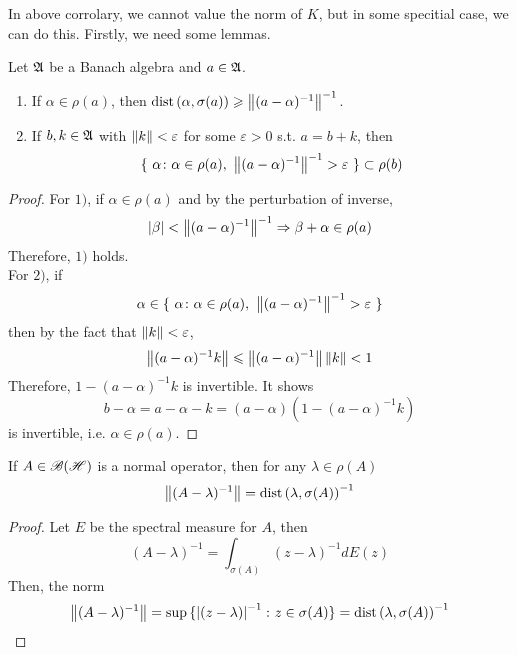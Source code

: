 In above corrolary, we cannot value the norm of $K$, but in some specitial case, we can do this. Firstly, we need some lemmas.
\begin{lem}
	Let $\mathfrak{A}$ be a Banach algebra and $a \in \mathfrak{A}$.
	\begin{enumerate}[label=\arabic*)]
		\item If $\alpha \in \rho(a)$, then $\operatorname{dist}{(\alpha,\sigma(a))} \geqslant \left\lVert(a-\alpha)^{-1}\right\lVert^{-1}$.
		\item If $b,k \in \mathfrak{A}$ with $\left\lVert k\right\lVert < \varepsilon$ for some $\varepsilon > 0$ s.t. $a = b + k$, then 
		\begin{equation*}
			\{~\alpha \colon \alpha \in \rho(a),~ \left\lVert(a-\alpha)^{-1}\right\lVert^{-1} > \varepsilon~\} \subset \rho(b)
		\end{equation*}
	\end{enumerate}
\end{lem}
\begin{proof}
	For $1)$, if $\alpha \in \rho(a)$ and by the perturbation of inverse, 
	\begin{equation*}
		\left\lvert\beta\right\lvert < \left\lVert(a-\alpha)^{-1}\right\lVert^{-1} \Rightarrow \beta + \alpha \in \rho(a)
 	\end{equation*}
 	Therefore, $1)$ holds. \\
 	For $2)$, if
 	\begin{equation*}
 		\alpha \in \{~\alpha \colon \alpha \in \rho(a),~ \left\lVert(a-\alpha)^{-1}\right\lVert^{-1} > \varepsilon~\}
 	\end{equation*}
 	then by the fact that $\left\lVert k\right\lVert < \varepsilon$, 
 	\begin{equation*}
 		\left\lVert(a-\alpha)^{-1} k\right\lVert \leqslant \left\lVert(a-\alpha)^{-1}\right\lVert \left\lVert k\right\lVert < 1
 	\end{equation*}
 	Therefore, $1 - (a-\alpha)^{-1} k$ is invertible. It shows
 	\begin{equation*}
 		b - \alpha = a - \alpha - k = (a - \alpha)(1 - (a-\alpha)^{-1} k)
 	\end{equation*}
 	is invertible, i.e. $\alpha \in \rho(a)$.
\end{proof}

\begin{lem}
	If $A \in \mathscr{B(H)}$ is a normal operator, then for any $\lambda \in \rho(A)$
	\begin{equation*}
		\left\lVert(A-\lambda)^{-1}\right\lVert = \operatorname{dist}{(\lambda, \sigma(A))}^{-1}
	\end{equation*}
\end{lem}
\begin{proof}
	Let $E$ be the spectral measure for $A$, then
	\begin{equation*}
		(A-\lambda)^{-1} = \int_{\sigma(A)} (z - \lambda)^{-1} dE(z)
	\end{equation*}
	Then, the norm
	\begin{equation*}
		\left\lVert(A-\lambda)^{-1}\right\lVert = \sup{\{\left\lvert(z-\lambda)\right\lvert^{-1} \colon z \in \sigma(A)\}} = \operatorname{dist}{(\lambda, \sigma(A))}^{-1} \qedhere
	\end{equation*}
\end{proof}

